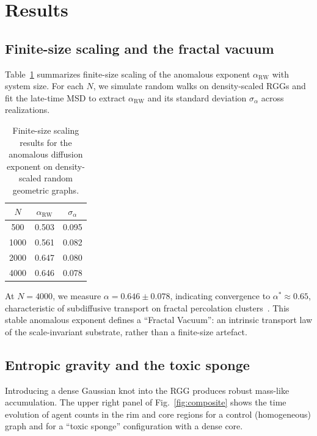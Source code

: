 \documentclass[aps,pre,twocolumn,superscriptaddress,10pt,floatfix]{revtex4-2}
\begin{document}
\section{Results}

\subsection{Finite-size scaling and the fractal vacuum}

Table~\ref{tab:fss} summarizes finite-size scaling of the anomalous exponent $\alpha_{\mathrm{RW}}$ with system size. For each $N$, we simulate random walks on density-scaled RGGs and fit the late-time MSD to extract $\alpha_{\mathrm{RW}}$ and its standard deviation $\sigma_\alpha$ across realizations.

\begin{table}[b]
  \caption{Finite-size scaling results for the anomalous diffusion exponent on density-scaled random geometric graphs.}
  \label{tab:fss}
  \begin{ruledtabular}
  \begin{tabular}{ccc}
    $N$ & $\alpha_{\mathrm{RW}}$ & $\sigma_\alpha$ \\
    \hline
    500  & 0.503 & 0.095 \\
    1000 & 0.561 & 0.082 \\
    2000 & 0.647 & 0.080 \\
    4000 & 0.646 & 0.078 \\
  \end{tabular}
  \end{ruledtabular}
\end{table}

At $N = 4000$, we measure $\alpha = 0.646 \pm 0.078$, indicating convergence to $\alpha^\ast \approx 0.65$, characteristic of subdiffusive transport on fractal percolation clusters~\cite{havlin2002}. This stable anomalous exponent defines a ``Fractal Vacuum'': an intrinsic transport law of the scale-invariant substrate, rather than a finite-size artefact.

\subsection{Entropic gravity and the toxic sponge}

Introducing a dense Gaussian knot into the RGG produces robust mass-like accumulation. The upper right panel of Fig.~\ref{fig:composite} shows the time evolution of agent counts in the rim and core regions for a control (homogeneous) graph and for a ``toxic sponge'' configuration with a dense core.
\end{document}
